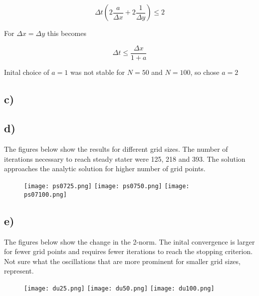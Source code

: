 \documentclass{article}
\begin{document}
\begin{equation}
\Delta t (2 \frac{a}{\Delta x} + 2\frac{1}{\Delta y} )\leq 2
\end{equation}

For $\Delta x = \Delta y$ this becomes

\begin{equation}
\Delta t \leq \frac{\Delta x}{1+a}
\end{equation}

Inital choice of $a=1$ was not stable for $N=50$ and $N=100$, so chose $a=2$




\subsection{c)}






\newpage
\clearpage

\subsection{d)}
The figures below show the results for different grid sizes. The number of iterations necessary to reach steady stater were 125, 218 and 393. The solution approaches the analytic solution for higher number of grid points.

\begin{figure}
	\texttt{[image: ps0725.png]}
	\texttt{[image: ps0750.png]}
	\texttt{[image: ps07100.png]}
\end{figure}

\newpage
\clearpage
\subsection{e)}
The figures below show the change in the 2-norm. The inital convergence is larger for fewer grid points and requires fewer iterations to reach the stopping criterion. Not sure what the oscillations that are more prominent for smaller grid sizes, represent.

\begin{figure}
	\texttt{[image: du25.png]}
	\texttt{[image: du50.png]}
	\texttt{[image: du100.png]}
\end{figure}
\end{document}

